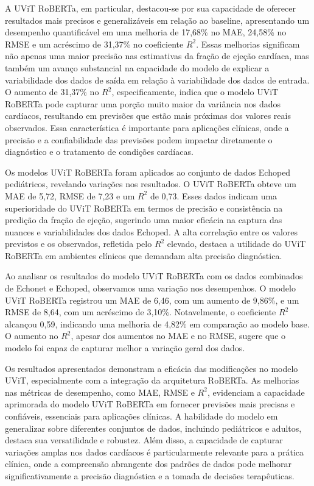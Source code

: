 A UViT RoBERTa, em particular, destacou-se por sua capacidade de oferecer resultados mais precisos e generalizáveis em relação ao baseline, apresentando um desempenho quantificável em uma melhoria de 17,68\% no MAE, 24,58\% no RMSE e um acréscimo de 31,37\% no coeficiente \(R^2\). Essas melhorias significam não apenas uma maior precisão nas estimativas da fração de ejeção cardíaca, mas também um avanço substancial na capacidade do modelo de explicar a variabilidade dos dados de saída em relação à variabilidade dos dados de entrada. O aumento de 31,37\% no \(R^2\), especificamente, indica que o modelo UViT RoBERTa pode capturar uma porção muito maior da variância nos dados cardíacos, resultando em previsões que estão mais próximas dos valores reais observados. Essa característica é importante para aplicações clínicas, onde a precisão e a confiabilidade das previsões podem impactar diretamente o diagnóstico e o tratamento de condições cardíacas.

Os modelos UViT RoBERTa foram aplicados ao conjunto de dados Echoped pediátricos, revelando variações nos resultados. O UViT RoBERTa obteve um MAE de 5,72, RMSE de 7,23 e um \( R^2 \) de 0,73. Esses dados indicam uma superioridade do UViT RoBERTa em termos de precisão e consistência na predição da fração de ejeção, sugerindo uma maior eficácia na captura das nuances e variabilidades dos dados Echoped. A alta correlação entre os valores previstos e os observados, refletida pelo \( R^2 \) elevado, destaca a utilidade do UViT RoBERTa em ambientes clínicos que demandam alta precisão diagnóstica.

Ao analisar os resultados do modelo UViT RoBERTa com os dados combinados de Echonet e Echoped, observamos uma variação nos desempenhos. O modelo UViT RoBERTa registrou um MAE de 6,46, com um aumento de 9,86\%, e um RMSE de 8,64, com um acréscimo de 3,10\%. Notavelmente, o coeficiente \( R^2 \) alcançou 0,59, indicando uma melhoria de 4,82\% em comparação ao modelo base. O aumento no \( R^2 \), apesar dos aumentos no MAE e no RMSE, sugere que o modelo foi capaz de capturar melhor a variação geral dos dados.

Os resultados apresentados demonstram a eficácia das modificações no modelo UViT, especialmente com a integração da arquitetura RoBERTa. As melhorias  nas métricas de desempenho, como MAE, RMSE e \( R^2 \), evidenciam a capacidade aprimorada do modelo UViT RoBERTa em fornecer previsões mais precisas e confiáveis, essenciais para aplicações clínicas. A habilidade do modelo em generalizar sobre diferentes conjuntos de dados, incluindo pediátricos e adultos, destaca sua versatilidade e robustez. Além disso, a capacidade de capturar variações amplas nos dados cardíacos é particularmente relevante para a prática clínica, onde a compreensão abrangente dos padrões de dados pode melhorar significativamente a precisão diagnóstica e a tomada de decisões terapêuticas.
